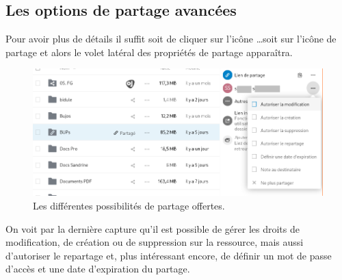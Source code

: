 \subsection{Les options de partage avancées}
Pour avoir  plus de détails il suffit soit de cliquer sur l'icône \ldots soit sur l'icône de partage et alors le volet latéral des propriétés de partage apparaîtra.
\begin{figure}
	\centering
	\includegraphics{./Captures/nuage.partager.menu.contextuel.png}
	\caption{Les différentes possibilités de partage offertes.}
\end{figure}

On voit par la dernière capture qu'il est possible de gérer les droits de modification, de création ou de suppression sur la ressource, mais aussi d'autoriser le repartage et, plus intéressant encore, de définir un mot de passe d'accès et une date d'expiration du partage.